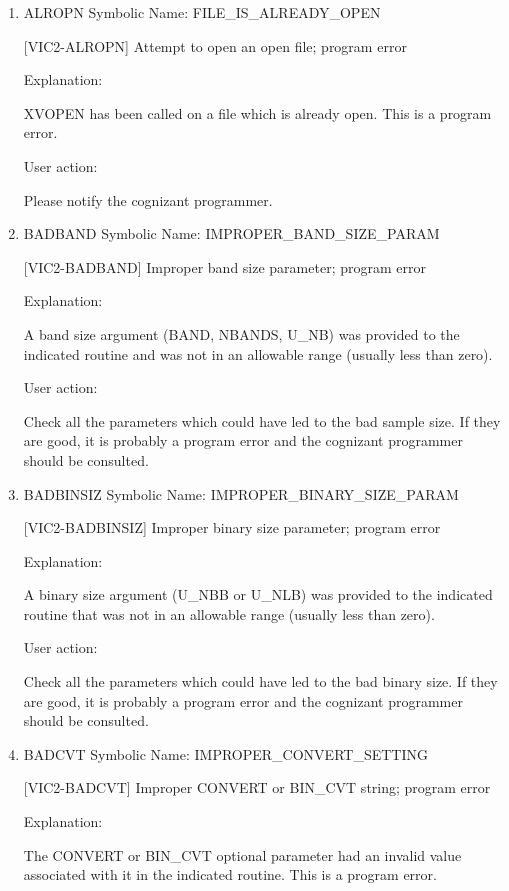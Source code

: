 \begin{enumerate}

\item ALROPN Symbolic Name: FILE\_IS\_ALREADY\_OPEN

[VIC2-ALROPN] Attempt to open an open file; program error

Explanation:

XVOPEN has been called on a file which is already open.
This is a program error.

User action:

Please notify the cognizant programmer.


\item BADBAND Symbolic Name: IMPROPER\_BAND\_SIZE\_PARAM

[VIC2-BADBAND] Improper band size parameter; program error

Explanation:

A band size argument (BAND, NBANDS, U\_NB) was provided to the
indicated routine and was not in an allowable range (usually less
than zero).

User action:

Check all the parameters which could have led to the bad sample size.
If they are good, it is probably a program error and the cognizant
programmer should be consulted.


\item BADBINSIZ Symbolic Name: IMPROPER\_BINARY\_SIZE\_PARAM

[VIC2-BADBINSIZ] Improper binary size parameter; program error

Explanation:

A binary size argument (U\_NBB or U\_NLB) was provided to the
indicated routine that was not in an allowable range (usually
less than zero).

User action:

Check all the parameters which could have led to the bad binary
size.  If they are good, it is probably a program error and the
cognizant programmer should be consulted.


\item BADCVT Symbolic Name: IMPROPER\_CONVERT\_SETTING

[VIC2-BADCVT] Improper CONVERT or BIN\_CVT string; program error

Explanation:

The CONVERT or BIN\_CVT optional parameter had an invalid value
associated with it in the indicated routine.  This is a program error.


\end{enumerate}
